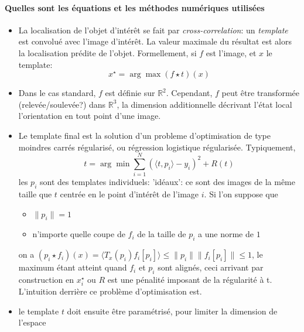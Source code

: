 \documentclass{article}
\begin{document}
\paragraph{Quelles sont les équations et les méthodes numériques utilisées} 
\begin{itemize}
    \item La localisation de l'objet d'intérêt se fait par \emph{cross-correlation}: un
        \emph{template} est convolué avec l'image d'intérêt. La valeur maximale du
        résultat est alors la localisation prédite de l'objet. Formellement, si $ f $
        est l'image, et $ x $
    le template:
    \[
        {x}^{\star} = \arg \max_{  } \left ( f \star t \right )(x)
    \] 
    \item Dans le cas standard, $ f $ est définie sur $ \mathbb{R}^2 $. Cependant, $ f $
        peut être transformée (relevée/soulevée?) dans $ \mathbb{R}^3 $, la dimension
        additionnelle décrivant l'état local l'orientation en tout point d'une image.
    \item Le template final est la solution d'un probleme d'optimisation de type
        moindres carrés régularisé, ou régression logistique régularisée.
        Typiquement,
        \[
        t = \arg \min_{  } \sum\limits_{ i=1 }^{ N } \left ( \langle t, p_i \rangle
        - y_i \right )^2 + R(t)
        \] 
        les $ p_i $ sont des templates individuels: 'idéaux': ce sont des images de la
        même taille que $ t $ centrée en le point d'intérêt de l'image $ i $. Si l'on
        suppose que 
        \begin{itemize}
            \item $ \|p_i\| = 1 $
            \item n'importe quelle coupe de $ f_i $ de la taille de $ p_i $ a une norme
                de $ 1 $
        \end{itemize}
        on a $ (p_i \star f_i)(x) = \mathcal  \langle T_x(p_i) f_i[p_i] \rangle  \leq
        \|p_i\| \|f_i[p_i]\| \leq  1$, le maximum étant atteint quand $ f_i $ et $ p_i $ 
        sont alignés, ceci arrivant par construction en $ {x}^{\star}_i $
        ou $ R $ est une pénalité imposant de la régularité à t.
        L'intuition derrière ce problème d'optimisation est.
    \item 
        le template $ t $ doit ensuite être paramétrisé, pour limiter la dimension de
        l'espace
\end{itemize}
\end{document}
